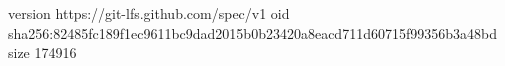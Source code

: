 version https://git-lfs.github.com/spec/v1
oid sha256:82485fc189f1ec9611bc9dad2015b0b23420a8eacd711d60715f99356b3a48bd
size 174916
